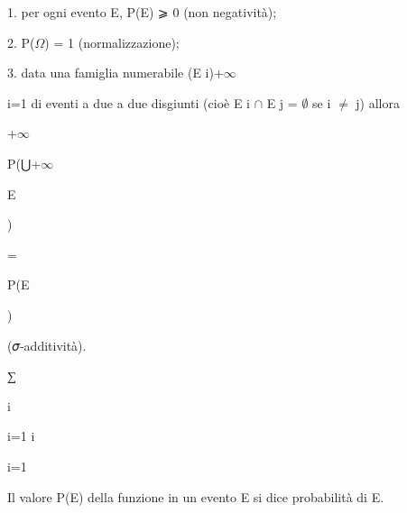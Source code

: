 \documentclass[a4paper,portrait,12pt]{article}
\begin{document}
\begin{flushleft}
1. per ogni evento E, P(E) ⩾ 0 (non negativit\`{a});
\end{flushleft}


\begin{flushleft}
2. P($\Omega$) = 1 (normalizzazione);
\end{flushleft}


\begin{flushleft}
3. data una famiglia numerabile (E i)+$\infty$
\end{flushleft}


\begin{flushleft}
i=1 di eventi a due a due disgiunti (cio\`{e} E i $\cap$ E j = $\emptyset$ se i $\neq$ j) allora
\end{flushleft}


+$\infty$


\begin{flushleft}
P(⋃+$\infty$
\end{flushleft}


\begin{flushleft}
E
\end{flushleft}


)


=


\begin{flushleft}
P(E
\end{flushleft}


)


\begin{flushleft}
(𝜎-additivit\`{a}).
\end{flushleft}


∑


\begin{flushleft}
i
\end{flushleft}


\begin{flushleft}
i=1 i
\end{flushleft}


\begin{flushleft}
i=1
\end{flushleft}





\begin{flushleft}
Il valore P(E) della funzione in un evento E si dice probabilit\`{a} di E.
\end{flushleft}
\end{document}
